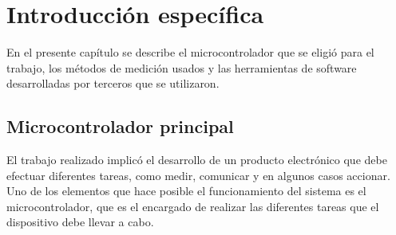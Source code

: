 \chapter{Introducción específica} %

\label{Chapter2}

%
%


En el presente capítulo se describe el microcontrolador que se eligió para el trabajo, los métodos de medición usados y las herramientas de software desarrolladas por terceros que se utilizaron.

\section{Microcontrolador principal}
\label{sec:cap2parte1}


El trabajo realizado implicó el desarrollo de un producto electrónico que debe efectuar diferentes tareas, como medir, comunicar y en algunos casos accionar. Uno de los elementos que hace posible el funcionamiento del sistema es el microcontrolador, que es el encargado de realizar las diferentes tareas que el dispositivo debe llevar a cabo. 

